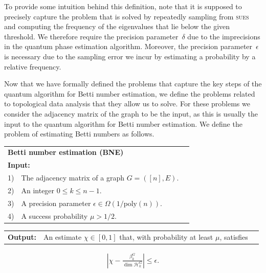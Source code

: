 \documentclass[a4paper, onecolumn, accepted=2022-08-28]{quantumarticle}
\begin{document}

To provide some intuition behind this definition, note that it is supposed to precisely capture the problem that is solved by repeatedly sampling from \textsc{sues} and computing the frequency of the eigenvalues that lie below the given threshold.
We therefore require the precision parameter~$\delta$ due to the imprecisions in the quantum phase estimation algorithm.
Moreover, the precision parameter~$\epsilon$ is necessary due to the sampling error we incur by estimating a probability by a relative frequency.

Now that we have formally defined the problems that capture the key steps of the quantum algorithm for Betti number estimation, we define the problems related to topological data analysis that they allow us to solve.
For these problems we consider the adjacency matrix of the graph to be the input, as this is usually the input to the quantum algorithm for Betti number estimation.
We define the problem of estimating Betti numbers as follows.

\vspace{5pt}
\noindent\begin{tabularx}{\linewidth}{l X c}
  \multicolumn{2}{l}{\textbf{\textsf{Betti number estimation (BNE)}}\footnotemark[4]} \\
  \multicolumn{2}{l}{\textbf{Input:}}\\
  1) & The adjacency matrix of a graph $G = ([n], E)$.\\
  2) & An integer $0 \leq k \leq n-1.$\\
  3) & A precision parameter $\epsilon \in \Omega\left(1/\mathrm{poly}(n)\right)$.\\
  4) & A success probability $\mu > 1/2$.\\
\end{tabularx}
\noindent\begin{tabularx}{\linewidth}{l X c}
  \textbf{Output:} & An estimate $\chi \in [0,1]$ that, with probability at least $\mu$, satisfies
\end{tabularx}
\vspace{-3pt}
\begin{align*}
   \left|\chi - \frac{\beta_k^G}{\dim \mathcal{H}_k^G}\right| \leq \epsilon.
\end{align*}
\end{document}
